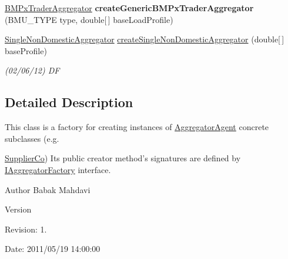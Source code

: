 \begin{DoxyCompactItemize}
\item 
\hypertarget{classuk_1_1ac_1_1dmu_1_1iesd_1_1cascade_1_1agents_1_1aggregators_1_1_aggregator_factory_a8016df4a4a85c5380ae2dba579dcd747}{\hyperlink{classuk_1_1ac_1_1dmu_1_1iesd_1_1cascade_1_1agents_1_1aggregators_1_1_b_m_px_trader_aggregator}{B\-M\-Px\-Trader\-Aggregator} {\bfseries create\-Generic\-B\-M\-Px\-Trader\-Aggregator} (B\-M\-U\-\_\-\-T\-Y\-P\-E type, double\mbox{[}$\,$\mbox{]} base\-Load\-Profile)}\label{classuk_1_1ac_1_1dmu_1_1iesd_1_1cascade_1_1agents_1_1aggregators_1_1_aggregator_factory_a8016df4a4a85c5380ae2dba579dcd747}

\item 
\hyperlink{classuk_1_1ac_1_1dmu_1_1iesd_1_1cascade_1_1agents_1_1aggregators_1_1_single_non_domestic_aggregator}{Single\-Non\-Domestic\-Aggregator} \hyperlink{classuk_1_1ac_1_1dmu_1_1iesd_1_1cascade_1_1agents_1_1aggregators_1_1_aggregator_factory_a3cf272d57c2f4bcefc7523538afff6fc}{create\-Single\-Non\-Domestic\-Aggregator} (double\mbox{[}$\,$\mbox{]} base\-Profile)
\begin{DoxyCompactList}\small\item\em (02/06/12) D\-F \end{DoxyCompactList}\end{DoxyCompactItemize}


\subsection{Detailed Description}
This class is a factory for creating instances of {\ttfamily \hyperlink{classuk_1_1ac_1_1dmu_1_1iesd_1_1cascade_1_1agents_1_1aggregators_1_1_aggregator_agent}{Aggregator\-Agent}} concrete subclasses (e.\-g. 

{\ttfamily \hyperlink{classuk_1_1ac_1_1dmu_1_1iesd_1_1cascade_1_1agents_1_1aggregators_1_1_supplier_co}{Supplier\-Co}}) Its public creator method's signatures are defined by \hyperlink{interfaceuk_1_1ac_1_1dmu_1_1iesd_1_1cascade_1_1agents_1_1aggregators_1_1_i_aggregator_factory}{I\-Aggregator\-Factory} interface.

\begin{DoxyAuthor}{Author}
Babak Mahdavi 
\end{DoxyAuthor}
\begin{DoxyVersion}{Version}

\end{DoxyVersion}
\begin{DoxyParagraph}{Revision\-:}
1. 
\end{DoxyParagraph}
\begin{DoxyParagraph}{Date\-:}
2011/05/19 14\-:00\-:00 
\end{DoxyParagraph}


